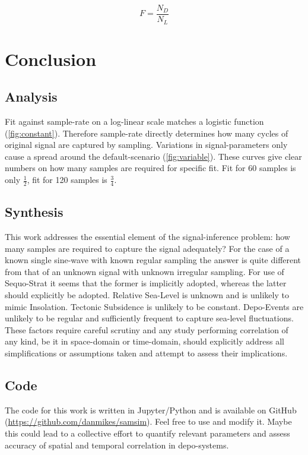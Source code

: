 \documentclass[12pt]{article}
\begin{document}
$$
F = \frac{N_D}{N_L}
$$

\section*{Conclusion}

\subsection*{Analysis}

Fit against sample-rate on a log-linear scale matches a logistic function (\autoref{fig:constant}). Therefore sample-rate directly determines how many cycles of original signal are captured by sampling. Variations in signal-parameters only cause a spread around the default-scenario (\autoref{fig:variable}). These curves give clear numbers on how many samples are required for specific fit. Fit for 60 samples is only $\frac{1}{2}$, fit for 120 samples is $\frac{3}{4}$.

\subsection*{Synthesis}

This work addresses the essential element of the signal-inference problem: how many samples are required to capture the signal adequately? For the case of a known single sine-wave with known regular sampling the answer is quite different from that of an unknown signal with unknown irregular sampling. For use of Sequo-Strat it seems that the former is implicitly adopted, whereas the latter should explicitly be adopted. Relative Sea-Level is unknown and is unlikely to mimic Insolation. Tectonic Subsidence is unlikely to be constant. Depo-Events are unlikely to be regular and sufficiently frequent to capture sea-level fluctuations. These factors require careful scrutiny and any study performing correlation of any kind, be it in space-domain or time-domain, should explicitly address all simplifications or assumptions taken and attempt to assess their implications.

\subsection*{Code}

The code for this work is written in Jupyter/Python and is available on GitHub (\url{https://github.com/danmikes/samsim}). Feel free to use and modify it. Maybe this could lead to a collective effort to quantify relevant parameters and assess accuracy of spatial and temporal correlation in depo-systems.
\end{document}

